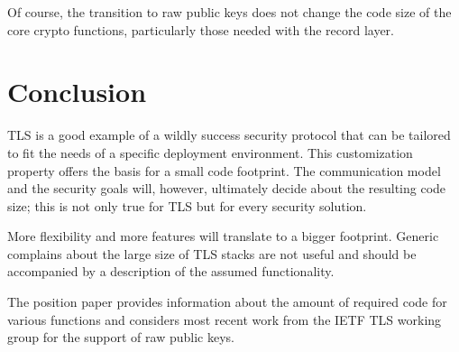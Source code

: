 \documentclass[a4paper, 10pt]{IEEEtran}
\begin{document}
Of course, the transition to raw public keys does not change the code size of the core crypto functions, particularly those needed with the record layer. 

\section{Conclusion}
TLS is a good example of a wildly success security protocol that can be tailored to fit the needs of a specific deployment environment. This customization property offers the basis for a small code footprint. The communication model and the security goals will, however, ultimately decide about the resulting code size; this is not only true for TLS but for every security solution. 

More flexibility and more features will translate to a bigger footprint. Generic complains about the large size of TLS stacks are not useful and should be accompanied by a description of the assumed functionality.  

The position paper provides information about the amount of required code for various functions and considers most recent work from the IETF TLS working group for the support of raw public keys. 


% 

\end{document}
